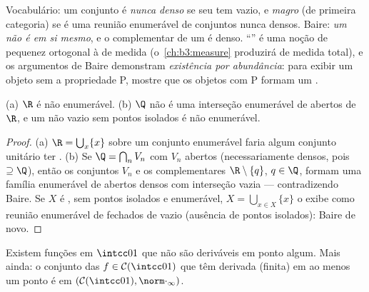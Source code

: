 \begin{remark}\label{rem:b3:complete:meagre}
Vocabulário: um conjunto é \emph{nunca denso} se seu  tem 
vazio, e \emph{magro} (de primeira categoria) se
é uma reunião enumerável de conjuntos nunca densos. Baire: \emph{um
 não é  em si mesmo}, e o complementar de
um  é denso. ``'' é uma noção de pequenez ortogonal à
de medida (o~\cref{ch:b3:measure} produzirá  de medida total),
e os argumentos de Baire demonstram \emph{existência por abundância}:
para exibir um objeto sem a propriedade P, mostre que os objetos com P
formam um .
\end{remark}

\begin{corollary}\label{cor:b3:complete:bairecors}
(a) $\R$ é não enumerável. (b) $\Q$ não é uma interseção
enumerável de abertos de $\R$, e um  não
vazio sem pontos isolados é não enumerável.
\end{corollary}

\begin{proof}
(a) $\R = \bigcup_{x}\{x\}$ sobre um conjunto enumerável faria algum conjunto unitário ter
. (b) Se $\Q = \bigcap_n V_n$ com $V_n$ abertos (necessariamente densos,
pois $\supseteq \Q$), então os conjuntos $V_n$ e os complementares $\R\setminus\{q\}$,
$q \in \Q$, formam uma família enumerável de abertos densos com interseção
vazia --- contradizendo Baire. Se $X$ é , sem pontos
isolados e enumerável, $X = \bigcup_{x \in X}\{x\}$ o exibe como reunião enumerável de fechados
de  vazio (ausência de pontos isolados): Baire de novo.
\end{proof}

\begin{theorem}
\label{thm:b3:complete:nowherediff}
Existem funções  em $\intcc01$ que não são deriváveis em ponto
algum. Mais ainda: o conjunto das $f \in \mathcal C(\intcc01)$ que têm derivada (finita) em ao
menos um ponto é  em $(\mathcal C(\intcc01), \norm\cdot_\infty)$.
\end{theorem}

